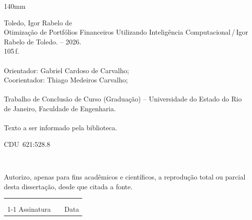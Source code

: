 \begin{titlepage}
\begin{center}
\begin{boxedminipage}{140mm}
{\begin{minipage}[top]{115mm}
		Toledo, Igor Rabelo de\\
		\phantom{XX}Otimização de Portfólios Financeiros Utilizando Inteligência Computacional\,/\,Igor Rabelo de Toledo. -- 2026.\\
		\phantom{XX}105\,f.\\
		\phantom{XX}\\
		\phantom{XX}Orientador: Gabriel Cardoso de Carvalho;\\
        \phantom{XX}Coorientador: Thiago Medeiros Carvalho;\\
\hspace*{5mm}\\
       		\phantom{XX}Trabalho de Conclusão de Curso (Graduação) -- Universidade do Estado do Rio de Janeiro, Faculdade de Engenharia.\\
		\phantom{XX}\\
		\phantom{XX}Texto a ser informado pela biblioteca.
	\end{minipage}}
	\vspace*{5mm}
	\begin{flushright}
	 CDU~621:528.8
	\end{flushright}
    \vspace{1mm}
	\end{boxedminipage}\\
	\end{center}
%
	Autorizo, apenas para fins acadêmicos e científicos, a reprodução total ou parcial desta dissertação, desde que citada a fonte.\\
	\noindent
	\begin{tabular}{ccc}
	\phantom{XXXXXXXXXXXXXXXXXXXXXXXXXXXXXX}&	 \phantom{XX}	&	\phantom{XXXXXXXXXXXXXXXX}	\\
	\phantom{XXXXXXXXXXXXXXXXXXXXXXXXXXXXXX}&	 \phantom{XX}	&	\phantom{XXXXXXXXXXXXXXXX}	\\
	\cline{1-1}\cline{3-3}
	Assinatura &		&	Data
	\end{tabular}
\end{titlepage}